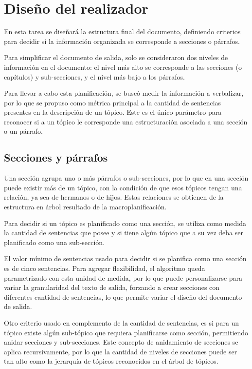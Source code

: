 \section{Diseño del realizador}
En esta tarea se diseñará la estructura final del documento, definiendo criterios para decidir si la información organizada se corresponde a secciones o párrafos.

Para simplificar el documento de salida, solo se consideraron dos niveles de información en el documento: el nivel más alto se corresponde a las secciones (o capítulos) y sub-secciones, y el nivel más bajo a los párrafos. 

Para llevar a cabo esta planificación, se buscó medir la información a verbalizar, por lo que se propuso como métrica principal a la cantidad de sentencias presentes en la descripción de un tópico. Este es el único parámetro para reconocer si a un tópico le corresponde una estructuración asociada a una sección o un párrafo. 

\subsection{Secciones y párrafos}
Una sección agrupa uno o más párrafos o sub-secciones, por lo que en una sección puede existir más de un tópico, con la condición de que esos tópicos tengan una relación, ya sea de hermanos o de hijos. Estas relaciones se obtienen de la estructura en árbol resultado de la macroplanificación. 

Para decidir si un tópico es planificado como una sección, se utiliza como medida la cantidad de sentencias que posee y si tiene algún tópico que a su vez deba ser planificado como una sub-sección.

El valor mínimo de sentencias usado para decidir si se planifica como una sección es de cinco sentencias. Para agregar flexibilidad, el algoritmo queda parametrizado con esta unidad de medida, por lo que puede personalizarse para variar la granularidad del texto de salida, forzando a crear secciones con diferentes cantidad de sentencias, lo que permite variar el diseño del documento de salida.

Otro criterio usado en complemento de la cantidad de sentencias, es si para un tópico existe algún sub-tópico que requiera planificarse como sección, permitiendo anidar secciones y sub-secciones. Este concepto de anidamiento de secciones se aplica recursivamente, por lo que la cantidad de niveles de secciones puede ser tan alto como la jerarquía de tópicos reconocidos en el árbol de tópicos. 

